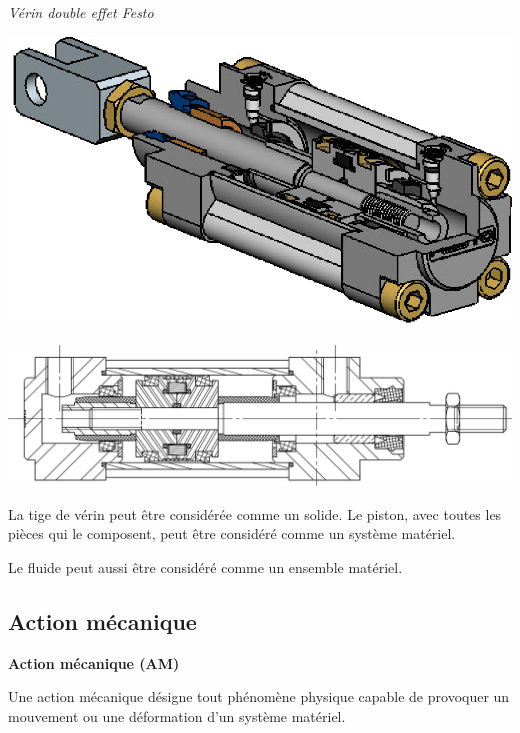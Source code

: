\documentclass[10pt]{article}
\begin{document}
\begin{exemple}
\textit{Vérin double effet Festo \cite{verin}}

\begin{minipage}[c]{.3\linewidth}
\begin{center}
\includegraphics[width=\textwidth]{images/verin2}
\end{center}
\end{minipage}\hfill
\begin{minipage}[c]{.6\linewidth}
\begin{center}
\includegraphics[width=\textwidth]{images/verin1}
\end{center}
\end{minipage}

La tige de vérin peut être considérée comme un solide. Le piston, avec toutes les pièces qui le composent, peut être considéré comme un système matériel. 

Le fluide peut aussi être considéré comme un ensemble matériel. 
\end{exemple}




\subsection{Action mécanique}
\begin{defi}
\textbf{Action mécanique (AM)}

Une action mécanique désigne tout phénomène physique capable de provoquer un mouvement ou une déformation d'un système matériel.
\end{defi}
\end{document}

